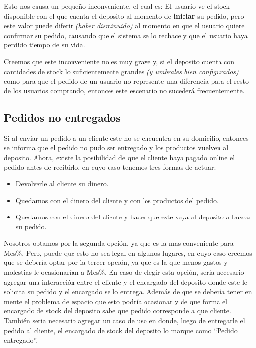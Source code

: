 Esto nos causa un pequeño inconveniente, el cual es: El usuario ve el stock disponible con el que cuenta el deposito al momento de \textbf{iniciar} su pedido, pero este valor puede diferir \textit{(haber disminuido)} al momento en que el usuario quiere confirmar su pedido, causando que el sistema se lo rechace y que el usuario haya perdido tiempo de su vida.

Creemos que este inconveniente no es muy grave y, si el deposito cuenta con cantidades de stock lo suficientemente grandes \textit{(y umbrales bien configurados)} como para que el pedido de un usuario no represente una diferencia para el resto de los usuarios comprando, entonces este escenario no sucederá frecuentemente.

\subsection{Pedidos no entregados}

Si al enviar un pedido a un cliente este no se encuentra en su domicilio, entonces se informa que el pedido no pudo ser entregado y los productos vuelven al deposito.
Ahora, existe la posibilidad de que el cliente haya pagado online el pedido antes de recibirlo, en cuyo caso tenemos tres formas de actuar:
\begin{itemize}
	\item Devolverle al cliente su dinero.
	\item Quedarnos con el dinero del cliente y con los productos del pedido.
	\item Quedarnos con el dinero del cliente y hacer que este vaya al deposito a buscar su pedido.
\end{itemize}

Nosotros optamos por la segunda opción, ya que es la mas conveniente para Mes\%. Pero, puede que esto no sea legal en algunos lugares, en cuyo caso creemos que se debería optar por la tercer opción, ya que es la que menos gastos y molestias le ocasionarían a Mes\%. En caso de elegir esta opción, seria necesario agregar una interacción entre el cliente y el encargado del deposito donde este le solicita su pedido y el encargado se lo entrega. Además de que se debería tener en mente el problema de espacio que esto podría ocasionar y de que forma el encargado de stock del deposito sabe que pedido corresponde a que cliente. También seria necesario agregar un caso de uso en donde, luego de entregarle el pedido al cliente, el encargado de stock del deposito lo marque como ``Pedido entregado''.

